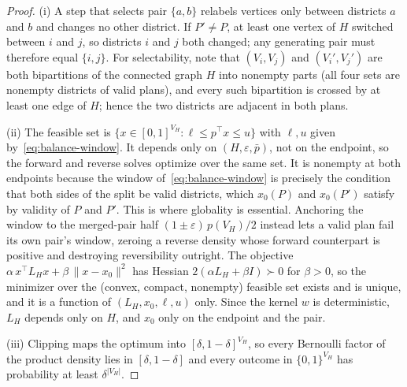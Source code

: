 \documentclass[11pt]{article}
\begin{document}
\begin{proof}
(i) A step that selects pair $\{a,b\}$ relabels vertices only
between districts $a$ and $b$ and changes no other district. If
$P' \ne P$, at least one vertex of $H$ switched between $i$ and $j$,
so districts $i$ and $j$ both changed; any generating pair must
therefore equal $\{i,j\}$. For selectability, note that
$(V_i, V_j)$ and $(V_i', V_j')$ are both bipartitions of the
connected graph $H$ into nonempty parts (all four sets are nonempty
districts of valid plans), and every such bipartition is crossed by
at least one edge of $H$; hence the two districts are adjacent in
both plans.

(ii) The feasible set is $\{x \in [0,1]^{V_H} : \ell \le p^\top x
\le u\}$ with $\ell, u$ given by~\eqref{eq:balance-window}. It
depends only on $(H, \varepsilon, \bar{p})$, not on the endpoint, so
the forward and reverse solves optimize over the same set. It is
nonempty at both endpoints because the window
of~\eqref{eq:balance-window} is precisely the condition that both
sides of the split be valid districts, which $x_0(P)$ and $x_0(P')$
satisfy by validity of $P$ and $P'$. This is where globality is
essential. Anchoring the window to the merged-pair half
$(1 \pm \varepsilon)\,p(V_H)/2$ instead lets a valid plan fail its
own pair's window, zeroing a reverse density whose forward
counterpart is positive and destroying reversibility outright. The
objective $\alpha\, x^\top L_H x + \beta\, \|x - x_0\|^2$ has Hessian
$2(\alpha L_H + \beta I) \succ 0$ for $\beta > 0$, so the minimizer
over the (convex, compact, nonempty) feasible set exists and is
unique, and it is a function of $(L_H, x_0, \ell, u)$ only. Since
the kernel $w$ is deterministic, $L_H$ depends only on $H$, and
$x_0$ only on the endpoint and the pair.

(iii) Clipping maps the optimum into $[\delta, 1-\delta]^{V_H}$, so
every Bernoulli factor of the product density lies in
$[\delta, 1-\delta]$ and every outcome in $\{0,1\}^{V_H}$ has
probability at least $\delta^{|V_H|}$.
\end{proof}
\end{document}
